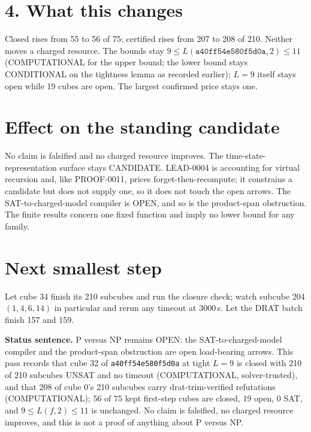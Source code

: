 \documentclass[11pt]{article}
\begin{document}
\section*{4. What this changes}
Closed rises from 55 to 56 of 75; certified rises from 207 to 208 of 210. Neither moves a charged resource. The bounds stay $9\le L(\texttt{a40ff54e580f5d0a},2)\le 11$ (COMPUTATIONAL for the upper bound; the lower bound stays CONDITIONAL on the tightness lemma as recorded earlier); $L=9$ itself stays open while 19 cubes are open. The largest confirmed price stays one.

\section*{Effect on the standing candidate}
No claim is falsified and no charged resource improves. The time-state-representation surface stays CANDIDATE. LEAD-0004 is accounting for virtual recursion and, like PROOF-0011, prices forget-then-recompute; it constrains a candidate but does not supply one, so it does not touch the open arrows. The SAT-to-charged-model compiler is OPEN, and so is the product-span obstruction. The finite results concern one fixed function and imply no lower bound for any family.

\section*{Next smallest step}
Let cube 34 finish its 210 subcubes and run the closure check; watch subcube 204 $(1,4,6,14)$ in particular and rerun any timeout at 3000\,s. Let the DRAT batch finish 157 and 159.

\bigskip
\noindent\textbf{Status sentence.} P versus NP remains OPEN: the SAT-to-charged-model compiler and the product-span obstruction are open load-bearing arrows. This pass records that cube 32 of \texttt{a40ff54e580f5d0a} at tight $L=9$ is closed with 210 of 210 subcubes UNSAT and no timeout (COMPUTATIONAL, solver-trusted), and that 208 of cube 0's 210 subcubes carry drat-trim-verified refutations (COMPUTATIONAL); 56 of 75 kept first-step cubes are closed, 19 open, 0 SAT, and $9\le L(f,2)\le 11$ is unchanged. No claim is falsified, no charged resource improves, and this is not a proof of anything about P versus NP.
\end{document}
